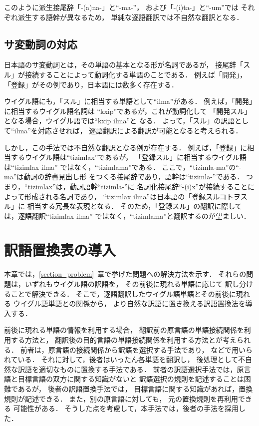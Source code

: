 このように派生接尾辞「-(a)na-」と``-ma-''，
および「-(i)ta-」と``-\mg um''では
それぞれ派生する語幹が異なるため，
単純な逐語翻訳では不自然な翻訳となる．

\subsection{サ変動詞の対応}
\label{sec:problem3}
日本語のサ変動詞とは，その単語の基本となる形が名詞であるが，
接尾辞「スル」が接続することによって動詞化する単語のことである．
例えば「開発」，「登録」がその例であり，日本語には数多く存在する．

ウイグル語にも，「スル」に相当する単語として``\mk ilma\mk''がある．
例えば，「開発」に相当するウイグル語名詞は
``k\me xip''であるが，これが動詞化して
「開発スル」となる場合，ウイグル語では``k\me xip \mk ilma\mk''と
なる．
よって，「スル」の訳語として``\mk ilma\mk''を対応させれば，
逐語翻訳による翻訳が可能となると考えられる．

しかし，この手法では不自然な翻訳となる例が存在する．
例えば，「登録」に相当するウイグル語は``tizimlax''であるが，
「登録スル」に相当するウイグル語は``tizimlax \mk ilma\mk''
ではなく，``tizimlama\mk''である．
ここで，``tizimla-ma\mk''の``-ma\mk''は動詞の辞書見出し形
をつくる接尾辞であり，語幹は``tizimla-''である．
つまり，``tizimlax''は，動詞語幹``tizimla-''に
名詞化接尾辞``-(i)x''が接続することによって形成される名詞であり，
``tizimlax \mk ilma\mk''は日本語の「登録スルコトヲスル」に
相当する冗長な表現となる．
そのため，「登録スル」の翻訳に際しては，逐語翻訳``tizimlax \mk ilma\mk''
ではなく，``tizimlama\mk''と翻訳するのが望ましい．

\vspace{-1mm}

\section{訳語置換表の導入}
\label{sec:replacement_table}
本章では，\ref{section_problem}~章で挙げた問題への解決方法を示す．
それらの問題は，いずれもウイグル語の訳語を，
その前後に現れる単語に応じて
訳し分けることで解決できる．
そこで，逐語翻訳したウイグル語単語とその前後に現れる
ウイグル語単語との関係から，
より自然な訳語に置き換える訳語置換法を導入する．

前後に現れる単語の情報を利用する場合，
翻訳前の原言語の単語接続関係を利用する方法と，
翻訳後の目的言語の単語接続関係を利用する方法とが考えられる．
前者は，原言語の接続関係から訳語を選択する手法であり，
\cite{J_KIM1996_2}などで用いられている．
それに対して，後者はいったん各単語を翻訳し，
後処理として不自然な訳語を適切なものに置換する手法である．
前者の訳語選択手法では，原言語と目標言語の双方に関する知識がないと
訳語選択の規則を記述することは困難であるが，
後者の訳語置換手法では，
目標言語に関する知識があれば，置換規則が記述できる．
また，別の原言語に対しても，
元の置換規則を再利用できる
可能性がある．
そうした点を考慮して，本手法では，後者の手法を採用した．


